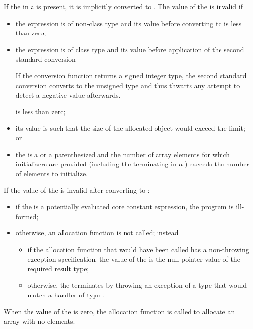 \pnum
{}%
If the  in a 
is present, it is implicitly converted to .
%
The value of the  is invalid if
\begin{itemize}
\item
the expression is of non-class type and its value before converting to
 is less than zero;

\item
the expression is of class type and its value before application of the second
standard conversion
\begin{footnote}
If the conversion function
returns a signed integer type, the second standard conversion converts to the
unsigned type  and thus thwarts any attempt to detect a
negative value afterwards.
\end{footnote}
is less than zero;

\item
its value is such that the size of the allocated object would exceed the
 limit; or

\item
the  is a 
or a parenthesized  and the
number of array elements for which initializers are provided (including the
terminating  in a ) exceeds the
number of elements to initialize.
\end{itemize}

If the value of the  is invalid after converting to :
\begin{itemize}
\item
if the  is a potentially evaluated core constant expression,
the program is ill-formed;
\item
otherwise, an allocation function is not called; instead
\begin{itemize}
\item
if the allocation function that would have been called
has a non-throwing exception specification,
the value of the 
is the null pointer value of the required result type;
\item
otherwise, the  terminates by throwing an
exception of a type that would match a handler of type
.
\end{itemize}
\end{itemize}
When the value of the  is zero, the allocation
function is called to allocate an array with no elements.

